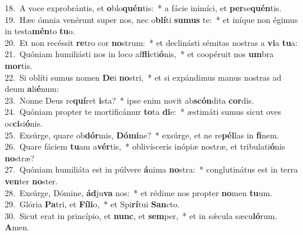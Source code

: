 {18.~}A voce exprobrántis, et \textbf{o}blo\textbf{quén}tis:~* a fácie inimíci, et \textbf{per}se\textbf{quén}tis.\\
{19.~}Hæc ómnia venérunt super nos, nec o\textbf{blí}ti \textbf{su}\textbf{mus} te:~* et iníque non égimus in testa\textbf{mén}to \textbf{tu}o.\\
{20.~}Et non recéssit \textbf{re}tro cor \textbf{no}strum:~* et declinásti sémitas nostras a \textbf{vi}a \textbf{tu}a:\\
{21.~}Quóniam humiliásti nos in loco af\textbf{fli}cti\textbf{ó}nis,~* et coopéruit nos \textbf{um}bra \textbf{mor}tis.\\
{22.~}Si oblíti sumus nomen \textbf{De}i \textbf{no}stri,~* et si expándimus manus nostras ad deum \textbf{a}li\textbf{é}num:\\
{23.~}Nonne Deus re\textbf{quí}ret \textbf{i}sta?~* ipse enim novit ab\textbf{scón}dita \textbf{cor}dis.\\
{24.~}Quóniam propter te mortificámur \textbf{to}ta \textbf{di}e:~* æstimáti sumus sicut oves oc\textbf{ci}si\textbf{ó}nis.\\
{25.~}Exsúrge, quare ob\textbf{dór}mis, \textbf{Dó}\textbf{mi}ne?~* exsúrge, et ne re\textbf{pél}las in \textbf{fi}nem.\\
{26.~}Quare fáciem \textbf{tu}am a\textbf{vér}tis,~* oblivísceris inópiæ nostræ, et tribulati\textbf{ó}nis \textbf{no}stræ?\\
{27.~}Quóniam humiliáta est in púlvere \textbf{á}nima \textbf{no}stra:~* conglutinátus est in terra \textbf{ven}ter \textbf{no}ster.\\
{28.~}Exsúrge, Dómine, \textbf{ád}ju\textbf{va} nos:~* et rédime nos propter \textbf{no}men \textbf{tu}um.\\
{29.~}Glória \textbf{Pa}tri, et \textbf{Fí}\textbf{li}o,~* et Spi\textbf{rí}tui \textbf{San}cto.\\
{30.~}Sicut erat in princípio, et \textbf{nunc}, et \textbf{sem}per,~* et in sǽcula sæcu\textbf{ló}rum. \textbf{A}men.\\
